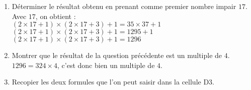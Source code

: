 \begin{corrige}
\begin{enumerate}
        \smallskip
        \hspace*{-10mm}
        \scalebox{0.55}{
        \begin{Tableur}[Bandeau=false,Colonnes=5,Largeur=80pt]
            &Nombre impair&Nombre impair suivant&Produit&Résultat obtenu\\
            $x$&$2x+1$&$2x+3$&$(2x+1)(2x+3)$&$(2x+1)(2x+3)+1$\\
            $0$&$1$&$3$&$3$&$4$\\
            $1$&$3$&$5$&$15$&$16$\\
            $2$&$5$&$7$&$35$&$36$\\
            $3$&$7$&$9$&$63$&$64$\\
            $4$&$9 $&$11$&$99 $&$100$\\
            $5$&$11$&$13$&$143$&$144$\\
            $6$&$13$&$15$&$195$&$196$\\
            $7$&$15$&$17$&$255$&$256$\\
            $8$&$17$&$19$&$323$&$324$\\
            $9$&$19$&$21$&$399$&$400$\\
        \end{Tableur}       
        }
        \smallskip
        \begin{enumerate}
            \item Déterminer le résultat obtenu en prenant comme premier nombre impair $17$.\\
            {\red Avec $17$, on obtient : \\
            $(2\times 17 + 1)\times (2\times 17 + 3)+1=35\times 37+1$\\
            $(2\times 17 + 1)\times (2\times 17 + 3)+1=\num{1295}+1$\\
            $(2\times 17 + 1)\times (2\times 17 + 3)+1=\num{1296}$\\
            }
            \item Montrer que le résultat de la question précédente est un multiple de $4$.\\
            {\red $\num{1296}=324\times 4$, c'est donc bien un multiple de $4$.}\\
        \end{enumerate}
    \end{enumerate}
    \Coupe
    \begin{enumerate}        
        \begin{enumerate}
            \setcounter{enumii}{2}
            \item Recopier les deux formules que l'on peut saisir dans la cellule D3.\\

\end{enumerate}
\end{enumerate}
\end{corrige}
